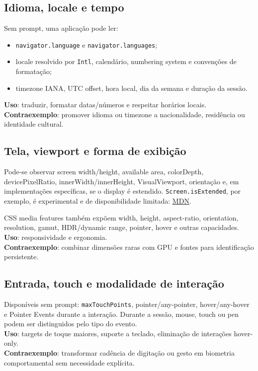 \documentclass[11pt,a4paper]{article}
\begin{document}
\subsection{Idioma, locale e tempo}
Sem prompt, uma aplicação pode ler:
\begin{itemize}
\item \texttt{navigator.language} e \texttt{navigator.languages};
\item locale resolvido por \texttt{Intl}, calendário, numbering system e convenções de formatação;
\item timezone IANA, UTC offset, hora local, dia da semana e duração da sessão.
\end{itemize}
\textbf{Uso}: traduzir, formatar datas/números e respeitar horários locais.\\
\textbf{Contraexemplo}: promover idioma ou timezone a nacionalidade, residência ou identidade cultural.

\subsection{Tela, viewport e forma de exibição}
Pode-se observar screen width/height, available area, colorDepth, devicePixelRatio, innerWidth/innerHeight, VisualViewport, orientação e, em implementações específicas, se o display é estendido. \texttt{Screen.isExtended}, por exemplo, é experimental e de disponibilidade limitada: \href{https://developer.mozilla.org/en-US/docs/Web/API/Screen/isExtended}{MDN}.

CSS media features também expõem width, height, aspect-ratio, orientation, resolution, gamut, HDR/dynamic range, pointer, hover e outras capacidades.\\
\textbf{Uso}: responsividade e ergonomia.\\
\textbf{Contraexemplo}: combinar dimensões raras com GPU e fontes para identificação persistente.

\subsection{Entrada, touch e modalidade de interação}
Disponíveis sem prompt: \texttt{maxTouchPoints}, pointer/any-pointer, hover/any-hover e Pointer Events durante a interação. Durante a sessão, mouse, touch ou pen podem ser distinguidos pelo tipo do evento.\\
\textbf{Uso}: targets de toque maiores, suporte a teclado, eliminação de interações hover-only.\\
\textbf{Contraexemplo}: transformar cadência de digitação ou gesto em biometria comportamental sem necessidade explícita.
\end{document}
